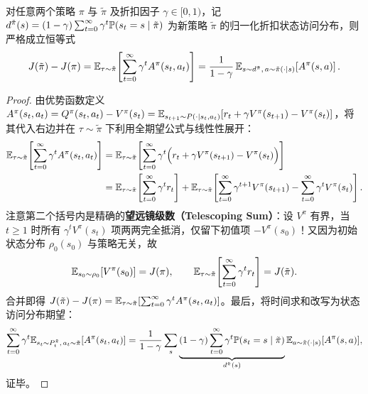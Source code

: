 \begin{thmBox}
\begin{lemma}
\label{lem:pdl}
对任意两个策略 $\pi$ 与 $\tilde{\pi}$ 及折扣因子 $\gamma \in [0, 1)$，记 $d^{\tilde{\pi}}(s) = (1 - \gamma)\sum_{t=0}^\infty \gamma^t \mathbb{P}(s_t = s \mid \tilde{\pi})$ 为新策略 $\tilde{\pi}$ 的归一化折扣状态访问分布，则严格成立恒等式
\begin{equation}
  J(\tilde{\pi}) - J(\pi)
  = \mathbb{E}_{\tau \sim \tilde{\pi}}\!\left[\sum_{t=0}^\infty \gamma^t A^\pi(s_t, a_t)\right]
  = \frac{1}{1-\gamma}\,\mathbb{E}_{s \sim d^{\tilde{\pi}},\, a \sim \tilde{\pi}(\cdot \mid s)}\!\left[A^\pi(s, a)\right].
  \label{eq:pdl}
\end{equation}
\end{lemma}
\begin{proof}
由优势函数定义 $A^\pi(s_t, a_t) = Q^\pi(s_t, a_t) - V^\pi(s_t) = \mathbb{E}_{s_{t+1} \sim P(\cdot\mid s_t, a_t)}[r_t + \gamma V^\pi(s_{t+1}) - V^\pi(s_t)]$，将其代入右边并在 $\tau \sim \tilde{\pi}$ 下利用全期望公式与线性性展开：
\begin{align*}
  \mathbb{E}_{\tau \sim \tilde{\pi}}\!\left[\sum_{t=0}^\infty \gamma^t A^\pi(s_t, a_t)\right]
  &= \mathbb{E}_{\tau \sim \tilde{\pi}}\!\left[\sum_{t=0}^\infty \gamma^t \Big(r_t + \gamma V^\pi(s_{t+1}) - V^\pi(s_t)\Big)\right] \\
  &= \mathbb{E}_{\tau \sim \tilde{\pi}}\!\left[\sum_{t=0}^\infty \gamma^t r_t\right]
     + \mathbb{E}_{\tau \sim \tilde{\pi}}\!\left[\sum_{t=0}^\infty \gamma^{t+1} V^\pi(s_{t+1}) - \sum_{t=0}^\infty \gamma^t V^\pi(s_t)\right].
\end{align*}
注意第二个括号内是精确的\textbf{望远镜级数（Telescoping Sum）}：设 $V^\pi$ 有界，当 $t \ge 1$ 时所有 $\gamma^t V^\pi(s_t)$ 项两两完全抵消，仅留下初值项 $-V^\pi(s_0)$！又因为初始状态分布 $\rho_0(s_0)$ 与策略无关，故
\[
  \mathbb{E}_{s_0 \sim \rho_0}[V^\pi(s_0)] = J(\pi), \qquad
  \mathbb{E}_{\tau \sim \tilde{\pi}}\!\left[\sum_{t=0}^\infty \gamma^t r_t\right] = J(\tilde{\pi}).
\]
合并即得 $J(\tilde{\pi}) - J(\pi) = \mathbb{E}_{\tau \sim \tilde{\pi}}[\sum_{t=0}^\infty \gamma^t A^\pi(s_t, a_t)]$。最后，将时间求和改写为状态访问分布期望：
\[
  \sum_{t=0}^\infty \gamma^t \mathbb{E}_{s_t \sim P_t^{\tilde{\pi}},\, a_t \sim \tilde{\pi}}\!\left[A^\pi(s_t, a_t)\right]
  = \frac{1}{1-\gamma}\sum_s \underbrace{(1-\gamma)\sum_{t=0}^\infty \gamma^t \mathbb{P}(s_t = s \mid \tilde{\pi})}_{d^{\tilde{\pi}}(s)} \mathbb{E}_{a \sim \tilde{\pi}(\cdot\mid s)}[A^\pi(s, a)],
\]
证毕。
\end{proof}
\end{thmBox}

